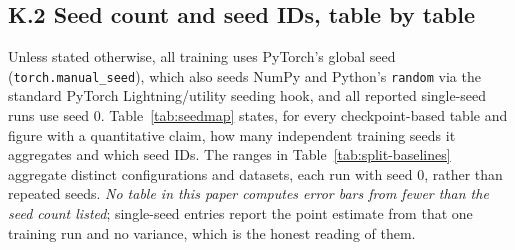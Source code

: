 \documentclass[letterpaper]{article}
\begin{document}
\subsection{K.2 Seed count and seed IDs, table by table}

Unless stated otherwise, all training uses PyTorch's global seed
(\texttt{torch.manual\_seed}), which also seeds NumPy and Python's
\texttt{random} via the standard PyTorch Lightning/utility seeding hook, and
all reported single-seed runs use seed $0$. Table~\ref{tab:seedmap} states,
for every checkpoint-based table and figure with a quantitative claim, how
many independent training seeds it aggregates and which seed IDs. The ranges
in Table~\ref{tab:split-baselines} aggregate distinct configurations and
datasets, each run with seed 0, rather than repeated seeds. \emph{No table in this
paper computes error bars from fewer than the seed count listed}; single-seed
entries report the point estimate from that one training run and no
variance, which is the honest reading of them.
\end{document}
